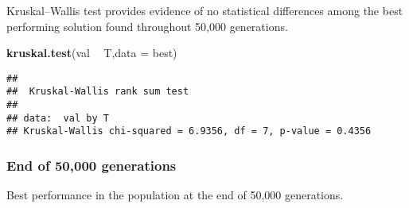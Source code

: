 \documentclass[]{book}
\newenvironment{Shaded}{\begin{snugshade}}{\end{snugshade}}
\newcommand{\DataTypeTok}[1]{\textcolor[rgb]{0.13,0.29,0.53}{#1}}
\newcommand{\KeywordTok}[1]{\textcolor[rgb]{0.13,0.29,0.53}{\textbf{#1}}}
\newcommand{\NormalTok}[1]{#1}
\newcommand{\OperatorTok}[1]{\textcolor[rgb]{0.81,0.36,0.00}{\textbf{#1}}}
\newcommand{\StringTok}[1]{\textcolor[rgb]{0.31,0.60,0.02}{#1}}
\begin{document}
Kruskal--Wallis test provides evidence of no statistical differences among the best performing solution found throughout 50,000 generations.

\begin{Shaded}
\begin{Highlighting}[]
\KeywordTok{kruskal.test}\NormalTok{(val }\OperatorTok{~}\StringTok{ }\NormalTok{T,}\DataTypeTok{data =}\NormalTok{ best)}
\end{Highlighting}
\end{Shaded}

\begin{verbatim}
## 
##  Kruskal-Wallis rank sum test
## 
## data:  val by T
## Kruskal-Wallis chi-squared = 6.9356, df = 7, p-value = 0.4356
\end{verbatim}

\hypertarget{end-of-50000-generations-16}{%
\subsubsection{End of 50,000 generations}\label{end-of-50000-generations-16}}

Best performance in the population at the end of 50,000 generations.
\end{document}
